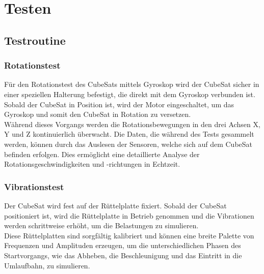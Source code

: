 \section{Testen}\label{sec: testen}

\subsection{Testroutine}\label{sec_routine}
\subsubsection{Rotationstest}
Für den Rotationstest des CubeSats mittels Gyroskop wird der CubeSat sicher in einer speziellen Halterung befestigt, die direkt mit dem Gyroskop verbunden ist. Sobald der CubeSat in Position ist, wird der Motor eingeschaltet, um das Gyroskop und somit den CubeSat in Rotation zu versetzen. \\
\vspace{3mm}
Während dieses Vorgangs werden die Rotationsbewegungen in den drei Achsen X, Y und Z kontinuierlich überwacht. Die Daten, die während des Tests gesammelt werden, können durch das Auslesen der Sensoren, welche sich auf dem CubeSat befinden erfolgen. Dies ermöglicht eine detaillierte Analyse der Rotationsgeschwindigkeiten und -richtungen in Echtzeit.

\subsubsection{Vibrationstest}
Der CubeSat wird fest auf der Rüttelplatte fixiert. Sobald der CubeSat positioniert ist, wird die Rüttelplatte in Betrieb genommen und die Vibrationen werden schrittweise erhöht, um die Belastungen zu simulieren.\\
\vspace{3mm}
Diese Rüttelplatten sind sorgfältig kalibriert und können eine breite Palette von Frequenzen und Amplituden erzeugen, um die unterschiedlichen Phasen des Startvorgangs, wie das Abheben, die Beschleunigung und das Eintritt in die Umlaufbahn, zu simulieren.

